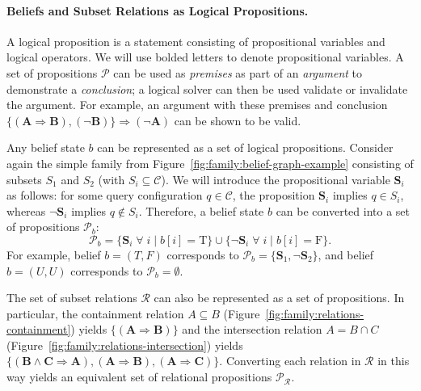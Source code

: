 \paragraph{Beliefs and Subset Relations as Logical Propositions.}
A logical proposition is a statement consisting of
propositional variables and logical operators.
We will use bolded letters to denote propositional variables.
A set of propositions $\mathcal{P}$ can be used as \emph{premises}
as part of an \emph{argument} to demonstrate a \emph{conclusion};
a logical solver can then be used validate or invalidate the argument.
For example, an argument with these premises and conclusion
$\{ (\mathbf{A} \Rightarrow \mathbf{B}), (\lnot\mathbf{B}) \}
\Rightarrow (\lnot\mathbf{A})$
can be shown to be valid.

Any belief state $b$ can be represented as a set of logical
propositions.
Consider again the simple family
from Figure~\ref{fig:family:belief-graph-example}
consisting of subsets $S_1$ and $S_2$
(with $S_i \subseteq \mathcal{C}$).
We will introduce the propositional variable $\mathbf{S}_i$ as follows:
for some query configuration $q \in \mathcal{C}$,
the proposition $\mathbf{S}_i$ implies $q \in S_i$,
whereas $\lnot\mathbf{S}_i$ implies $q \notin S_i$.
Therefore,
a belief state $b$ can be converted into a set of propositions
$\mathcal{P}_b$:
\begin{equation}
   \mathcal{P}_b = \{ \mathbf{S}_i \; \forall \; i \; | \; b[i] = \mbox{T} \}
      \cup \{ \lnot\mathbf{S}_i \; \forall \; i \; | \; b[i] = \mbox{F} \}.
   \label{eqn:family:belief-propositions}
\end{equation}
For example,
belief $b=(T,F)$ corresponds to
$\mathcal{P}_b = \{ \mathbf{S}_1, \lnot\mathbf{S}_2 \}$,
and belief $b=(U,U)$ corresponds to $\mathcal{P}_b = \emptyset$.

The set of subset relations $\mathcal{R}$
can also be represented as a set of propositions.
In particular,
the containment relation $A \subseteq B$
(Figure~\ref{fig:family:relations-containment})
yields $\{ ( \mathbf{A} \Rightarrow \mathbf{B} ) \}$
and the intersection relation $A = B \cap C$
(Figure~\ref{fig:family:relations-intersection})
yields 
$\{ ( \mathbf{B} \wedge \mathbf{C} \Rightarrow \mathbf{A} ),
( \mathbf{A} \Rightarrow \mathbf{B} ),
( \mathbf{A} \Rightarrow \mathbf{C} )
\}$.
Converting each relation in $\mathcal{R}$ in this way
yields an equivalent set of relational propositions
$\mathcal{P}_{\mathcal{R}}$.

